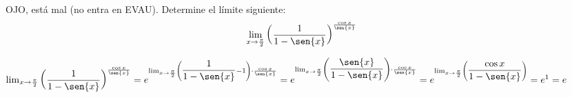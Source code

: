\documentclass[addpoints,spanish, 12pt,a4paper]{exam}
\begin{document}
\begin{questions}
\question[4] OJO, está mal (no entra en EVAU). Determine el límite siguiente: 
$$\lim_{x \to \frac{\pi}{2}} \left(\dfrac{1}{1-\sen{x}}\right)^\frac{\cos{x}}{\sen{x}}$$

\begin{solution}
$\lim_{x \to \frac{\pi}{2}} \left(\dfrac{1}{1-\sen{x}}\right)^\frac{\cos{x}}{\sen{x}}=
e^{\lim_{x \to \frac{\pi}{2}} \left(\dfrac{1}{1-\sen{x}}-1\right)\cdot\frac{\cos{x}}{\sen{x}}}=
e^{\lim_{x \to \frac{\pi}{2}} \left(\dfrac{\sen{x}}{1-\sen{x}}\right)\cdot\frac{\cos{x}}{\sen{x}}}=
e^{\lim_{x \to \frac{\pi}{2}} \left(\dfrac{\cos{x}}{1-\sen{x}}\right)}=e^1=e
$

\end{solution}





\end{questions}
\end{document}
